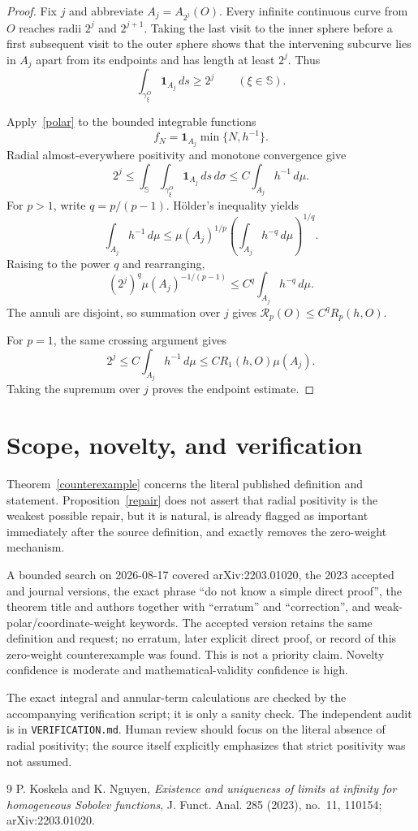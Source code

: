 \documentclass[11pt]{article}
\newcommand{\Sph}{\mathbb S}
\begin{document}
\begin{proof}
Fix $j$ and abbreviate $A_j=A_{2^j}(O)$.  Every infinite continuous curve
from $O$ reaches radii $2^j$ and $2^{j+1}$.  Taking the last visit to the
inner sphere before a first subsequent visit to the outer sphere shows that
the intervening subcurve lies in $A_j$ apart from its endpoints and has
length at least $2^j$.  Thus
\begin{equation}\label{crossing}
 \int_{\gamma^O_\xi}\mathbf1_{A_j}\,ds\ge2^j
 \qquad(\xi\in\Sph).
\end{equation}

Apply~\eqref{polar} to the bounded integrable functions
\[
 f_N=\mathbf1_{A_j}\min\{N,h^{-1}\}.
\]
Radial almost-everywhere positivity and monotone convergence give
\[
 2^j
 \le\int_{\Sph}\int_{\gamma^O_\xi}\mathbf1_{A_j}\,ds\,d\sigma
 \le C\int_{A_j}h^{-1}\,d\mu.
\]
For $p>1$, write $q=p/(p-1)$.  H\"older's inequality yields
\[
 \int_{A_j}h^{-1}\,d\mu
 \le\mu(A_j)^{1/p}
     \left(\int_{A_j}h^{-q}\,d\mu\right)^{1/q}.
\]
Raising to the power $q$ and rearranging,
\[
 (2^j)^q\mu(A_j)^{-1/(p-1)}
 \le C^q\int_{A_j}h^{-q}\,d\mu.
\]
The annuli are disjoint, so summation over $j$ gives
$\mathcal R_p(O)\le C^qR_p(h,O)$.

For $p=1$, the same crossing argument gives
\[
 2^j\le C\int_{A_j}h^{-1}\,d\mu
 \le C R_1(h,O)\mu(A_j).
\]
Taking the supremum over $j$ proves the endpoint estimate.
\end{proof}

\section{Scope, novelty, and verification}
Theorem~\ref{counterexample} concerns the literal published definition and
statement.  Proposition~\ref{repair} does not assert that radial positivity
is the weakest possible repair, but it is natural, is already flagged as
important immediately after the source definition, and exactly removes the
zero-weight mechanism.

A bounded search on 2026-08-17 covered arXiv:2203.01020, the 2023 accepted
and journal versions, the exact phrase ``do not know a simple direct proof'',
the theorem title and authors together with ``erratum'' and ``correction'',
and weak-polar/coordinate-weight keywords.  The accepted version retains the
same definition and request; no erratum, later explicit direct proof, or
record of this zero-weight counterexample was found.  This is not a priority
claim.  Novelty confidence is moderate and mathematical-validity confidence
is high.

The exact integral and annular-term calculations are checked by the
accompanying verification script; it is only a sanity check.  The independent
audit is in \texttt{VERIFICATION.md}.
Human review should focus on the literal absence of radial positivity; the
source itself explicitly emphasizes that strict positivity was not assumed.

\begin{thebibliography}{9}
P. Koskela and K. Nguyen,
\emph{Existence and uniqueness of limits at infinity for homogeneous
Sobolev functions}, J. Funct. Anal. 285 (2023), no.~11, 110154;
arXiv:2203.01020.
\end{thebibliography}
\end{document}
